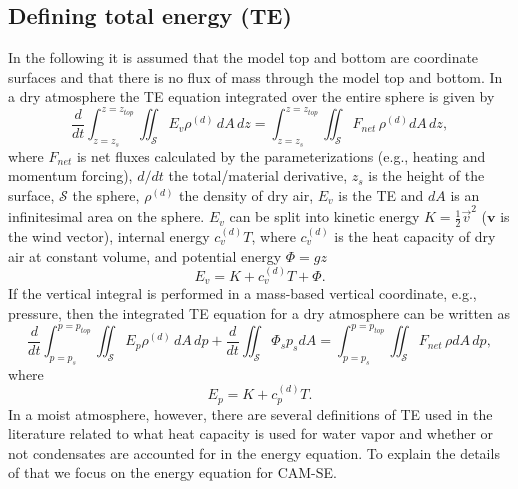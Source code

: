 \documentclass{agujournal}
\begin{document}
\subsection{Defining total energy (TE)}\label{sec:defE}
In the following it is assumed that the model top and bottom are coordinate surfaces and that there is no flux of mass through the model top and bottom. In a dry atmosphere the TE equation integrated over the entire sphere is given by
\begin{equation}
\frac{d}{dt}\int_{z=z_s}^{z=z_{top}}\iint_{\mathcal{S}} E_v \rho^{(d)}\, dA\, dz=\int_{z=z_s}^{z=z_{top}}\iint_{\mathcal{S}} F_{net}\, \rho^{(d)} dA\, dz,
\end{equation}
\citep[e.g., ][]{K1974MWR} where $F_{net}$ is net fluxes calculated by the parameterizations (e.g., heating and momentum forcing), $d/dt$ the total/material derivative, $z_s$ is the height of the surface, $\mathcal{S}$ the sphere, $\rho^{(d)}$ the density of dry air, $E_v$ is the TE and $dA$ is an infinitesimal area on the sphere. $E_v$ can be split into kinetic energy $K=\frac{1}{2}\vec{v}^2$ ($\mathbf{v}$ is the wind vector), internal energy $c_v^{(d)}T$, where $c_v^{(d)}$ is the heat capacity of dry air at constant volume, and potential energy $\Phi=gz$
\begin{equation}
E_v=K+c_v^{(d)}T+\Phi.
\end{equation}
If the vertical integral is performed in a mass-based vertical coordinate, e.g., pressure, then the integrated TE equation for a dry atmosphere can be written as
\begin{equation}
\frac{d}{dt}\int_{p=p_s}^{p=p_{top}}\iint_{\mathcal{S}} E_p \rho^{(d)}\, dA\, dp + \frac{d}{dt}\iint_{\mathcal{S}}\Phi_sp_s dA =\int_{p=p_s}^{p=p_{top}}\iint_{\mathcal{S}} F_{net}\, \rho dA\, dp,
\end{equation}
\citep[e.g., ][]{K1974MWR} where
\begin{equation}
E_p=K+c_p^{(d)}T.
\end{equation}
In a moist atmosphere, however, there are several definitions of TE used in the literature related to what heat capacity is used for water vapor and whether or not condensates are accounted for in the energy equation. To explain the details of that we focus on the energy equation for CAM-SE.
\end{document}
